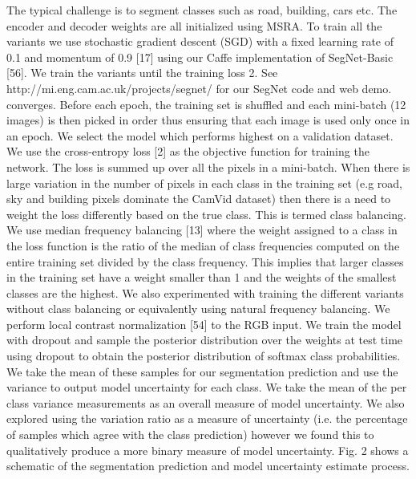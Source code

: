 The typical challenge is to segment classes such as road, building, cars etc. The encoder and decoder weights are all initialized using MSRA. To train all the variants we use stochastic gradient descent (SGD) with a fixed learning rate of 0.1 and momentum of 0.9 [17] using our Caffe implementation of SegNet-Basic [56]. We train the variants until the training loss
2. See http://mi.eng.cam.ac.uk/projects/segnet/ for our SegNet code and web demo.
converges. Before each epoch, the training set is shuffled and each mini-batch (12 images) is then picked in order thus ensuring that each image is used only once in an epoch. We select the model
which performs highest on a validation dataset. We use the cross-entropy loss [2] as the objective function for training the network. The loss is summed up over all the pixels in a mini-batch. When there is large variation in the number of pixels in each class in the training set (e.g road, sky and building
pixels dominate the CamVid dataset) then there is a need to weight the loss differently based on the true class. This is termed class balancing. We use median frequency balancing [13] where the
weight assigned to a class in the loss function is the ratio of the median of class frequencies computed on the entire training set divided by the class frequency. This implies that larger classes in
the training set have a weight smaller than 1 and the weights of the smallest classes are the highest. We also experimented with training the different variants without class balancing or
equivalently using natural frequency balancing.
We perform local contrast normalization [54] to the RGB input. 
We train the model with dropout and sample the posterior distribution over the weights at test time using dropout
to obtain the posterior distribution of softmax class probabilities. We take the mean of these samples for our segmentation prediction and use the variance to output model
uncertainty for each class. We take the mean of the per class
variance measurements as an overall measure of model uncertainty. We also explored using the variation ratio as
a measure of uncertainty (i.e. the percentage of samples
which agree with the class prediction) however we found
this to qualitatively produce a more binary measure of
model uncertainty. Fig. 2 shows a schematic of the segmentation prediction and model uncertainty estimate process.